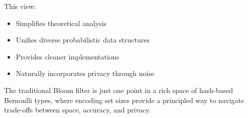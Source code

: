 \documentclass[11pt,final,hidelinks]{article}
\begin{document}
This view:
\begin{itemize}
    \item Simplifies theoretical analysis
    \item Unifies diverse probabilistic data structures
    \item Provides cleaner implementations
    \item Naturally incorporates privacy through noise
\end{itemize}

The traditional Bloom filter is just one point in a rich space of hash-based Bernoulli types, where encoding set sizes provide a principled way to navigate trade-offs between space, accuracy, and privacy.


\end{document}
